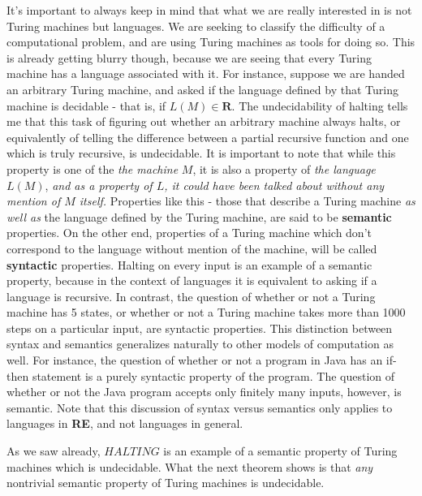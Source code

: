 \documentclass{article}
\theoremstyle{definition}
\theoremstyle{plain}
\theoremstyle{theorem}
\begin{document}
\par It's important to always keep in mind that what we are really interested in is not Turing machines but languages. We are seeking to classify the difficulty of a computational problem, and are using Turing machines as tools for doing so. This is already getting blurry though, because we are seeing that every Turing machine has a language associated with it. For instance, suppose we are handed an arbitrary Turing machine, and asked if the language defined by that Turing machine is decidable - that is, if $L(M) \in \textbf{R}$. The undecidability of halting tells me that this task of figuring out whether an arbitrary machine always halts, or equivalently of telling the difference between a partial recursive function and one which is truly recursive, is undecidable. It is important to note that while this property is one of the \textit{the machine} $M$, it is also a property of \textit{the language} $L(M)$, \textit{and as a property of $L$, it could have been talked about without any mention of $M$ itself.} Properties like this - those that describe a Turing machine \textit{as well as} the language defined by the Turing machine, are said to be \textbf{semantic} properties. On the other end, properties of a Turing machine which don't correspond to the language without mention of the machine, will be called \textbf{syntactic} properties. Halting on every input is an example of a semantic property, because in the context of languages it is equivalent to asking if a language is recursive. In contrast, the question of whether or not a Turing machine has 5 states, or whether or not a Turing machine takes more than 1000 steps on a particular input, are syntactic properties. This distinction between syntax and semantics generalizes naturally to other models of computation as well. For instance, the question of whether or not a program in Java has an if-then statement is a purely syntactic property of the program. The question of whether or not the Java program accepts only finitely many inputs, however, is semantic. Note that this discussion of syntax versus semantics only applies to languages in \textbf{RE}, and not languages in general.
\par As we saw already, $HALTING$ is an example of a semantic property of Turing machines which is undecidable. What the next theorem shows is that \textit{any} nontrivial semantic property of Turing machines is undecidable.
\end{document}
